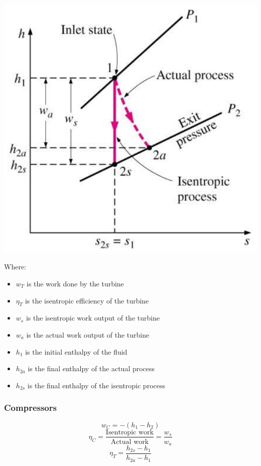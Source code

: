 \documentclass[11pt]{article}
\begin{document}
\begin{center}
\includegraphics[scale=0.75]{./images/isentropic-efficiency-of-turbines.png}
\end{center}

Where:
\begin{itemize}
\item \(w_T\) is the work done by the turbine
\item \(\eta_T\) is the isentropic efficiency of the turbine
\item \(w_s\) is the isentropic work output of the turbine
\item \(w_a\) is the actual work output of the turbine
\item \(h_1\) is the initial enthalpy of the fluid
\item \(h_{2a}\) is the final enthalpy of the actual process
\item \(h_{2s}\) is the final enthalpy of the isentropic process
\end{itemize}
\subsubsection{Compressors}
\label{sec:org73191c2}
\[w_C = -(h_1 - h_2)\]
\[\eta_C = \frac{\text{Isentropic work}}{\text{Actual work}} = \frac{w_s}{w_a}\]
\[\eta_T = \frac{h_{2s} - h_1}{h_{2a} - h_1}\]
\end{document}
